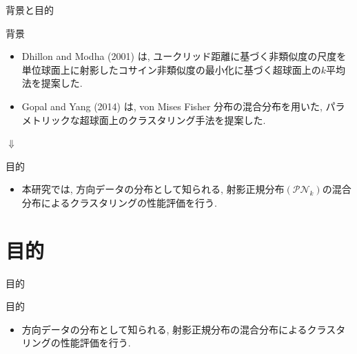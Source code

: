 \documentclass[dvipdfmx]{beamer} %
\begin{document}
\begin{frame}{背景と目的}

\begin{block}{背景}
\begin{itemize}
\item 
Dhillon and Modha (2001) は, ユークリッド距離に基づく非類似度の尺度を単位球面上に射影したコサイン非類似度の最小化に基づく超球面上の$k$平均法を提案した.

\item  
Gopal and Yang (2014) は, von Mises Fisher 分布の混合分布を用いた, パラメトリックな超球面上のクラスタリング手法を提案した.
\end{itemize}
\end{block}

\vspace{0.2cm}
\centering
{\LARGE $\Downarrow$}

\begin{alertblock}{目的}
\begin{itemize}
\item
本研究では, 方向データの分布として知られる, 射影正規分布$(\mathcal{PN}_k)$の混合分布によるクラスタリングの性能評価を行う.
\end{itemize}
\end{alertblock}
\end{frame}

\section{目的}
\begin{frame}{目的}
\begin{block}{目的}
\begin{itemize}

\item
方向データの分布として知られる, 射影正規分布の混合分布によるクラスタリングの性能評価を行う.

\end{itemize}
\end{block}
\end{frame}
\fi
\end{document}
